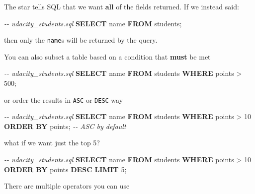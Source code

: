 \documentclass[11pt]{article}
\newenvironment{Shaded}{}{}
\newcommand{\KeywordTok}[1]{\textcolor[rgb]{0.00,0.44,0.13}{\textbf{{#1}}}}
\newcommand{\DecValTok}[1]{\textcolor[rgb]{0.25,0.63,0.44}{{#1}}}
\newcommand{\CommentTok}[1]{\textcolor[rgb]{0.38,0.63,0.69}{\textit{{#1}}}}
\newcommand{\NormalTok}[1]{{#1}}
\newcommand{\OperatorTok}[1]{\textcolor[rgb]{0.40,0.40,0.40}{{#1}}}
\begin{document}
The star tells SQL that we want \textbf{all} of the fields returned. If
we instead said:

\begin{Shaded}
\begin{Highlighting}[]
\CommentTok{{-}{-} udacity\_students.sql}
\KeywordTok{SELECT}\NormalTok{ name }
\KeywordTok{FROM}\NormalTok{ students;}
\end{Highlighting}
\end{Shaded}

then only the \texttt{name}s will be returned by the query.

You can also subset a table based on a condition that \textbf{must} be
met

\begin{Shaded}
\begin{Highlighting}[]
\CommentTok{{-}{-} udacity\_students.sql}
\KeywordTok{SELECT}\NormalTok{ name }
\KeywordTok{FROM}\NormalTok{ students}
\KeywordTok{WHERE}\NormalTok{ points }\OperatorTok{\textgreater{}} \DecValTok{500}\NormalTok{;}
\end{Highlighting}
\end{Shaded}

or order the results in \texttt{ASC} or \texttt{DESC} way

\begin{Shaded}
\begin{Highlighting}[]
\CommentTok{{-}{-} udacity\_students.sql}
\KeywordTok{SELECT}\NormalTok{ name }
\KeywordTok{FROM}\NormalTok{ students}
\KeywordTok{WHERE}\NormalTok{ points }\OperatorTok{\textgreater{}} \DecValTok{10}
\KeywordTok{ORDER} \KeywordTok{BY}\NormalTok{ points; }\CommentTok{{-}{-} ASC by default}
\end{Highlighting}
\end{Shaded}

what if we want just the top 5?

\begin{Shaded}
\begin{Highlighting}[]
\CommentTok{{-}{-} udacity\_students.sql}
\KeywordTok{SELECT}\NormalTok{ name }
\KeywordTok{FROM}\NormalTok{ students}
\KeywordTok{WHERE}\NormalTok{ points }\OperatorTok{\textgreater{}} \DecValTok{10}
\KeywordTok{ORDER} \KeywordTok{BY}\NormalTok{ points }\KeywordTok{DESC}
\KeywordTok{LIMIT} \DecValTok{5}\NormalTok{;}
\end{Highlighting}
\end{Shaded}

    There are multiple operators you can use
\end{document}
